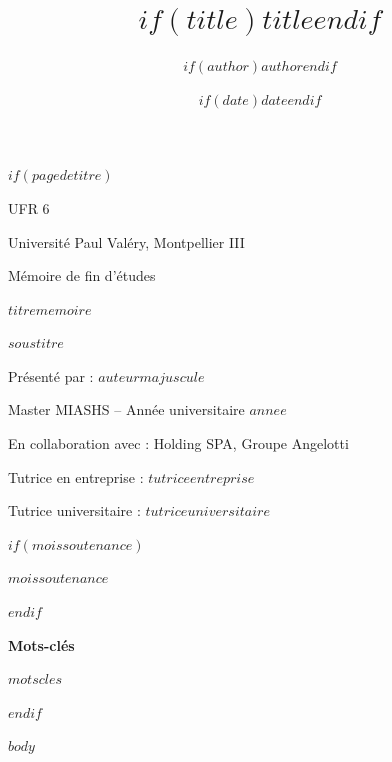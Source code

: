 \documentclass[12pt,a4paper]{report}
\title{$if(title)$$title$$endif$}
\author{$if(author)$$author$$endif$}
\date{$if(date)$$date$$endif$}
\begin{document}
$if(pagedetitre)$
\begin{titlepage}
\centering
\vspace*{1.5cm}
{\large UFR 6 \par}
{\large Université Paul Valéry, Montpellier III \par}
\vspace{2.5cm}
{\Large Mémoire de fin d'études \par}
\vspace{1.2cm}
{\huge\bfseries $titrememoire$ \par}
\vspace{0.6cm}
{\Large $soustitre$ \par}
\vspace{2.5cm}
{\large Présenté par : $auteurmajuscule$ \par}
\vspace{0.4cm}
{\large Master MIASHS -- Année universitaire $annee$ \par}
\vspace{0.4cm}
{\large En collaboration avec : Holding SPA, Groupe Angelotti \par}
\vspace{1.6cm}
{\large Tutrice en entreprise : $tutriceentreprise$ \par}
{\large Tutrice universitaire : $tutriceuniversitaire$ \par}
$if(moissoutenance)$
\vspace{1.2cm}
{\large $moissoutenance$ \par}
$endif$
\vfill
{\large\bfseries Mots-clés \par}
\vspace{0.3cm}
{\large $motscles$ \par}
\vspace{1.5cm}
\end{titlepage}
$endif$

\setcounter{page}{1}

$body$
\end{document}
